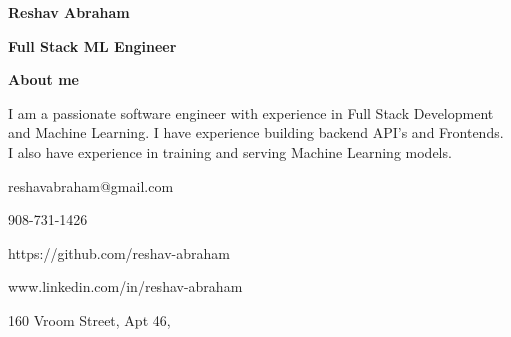 \documentclass{article}
\begin{document}
\begin{minipage}[t][0pt]{8in\linewidth}
    \begin{minipage}[t]{5.5in\linewidth}
    \Huge\vspace{0in}\hspace{-0.30em}\textbf{Reshav Abraham}  

    \vspace{0em}\hspace{-0.2em}\Large\textbf{Full Stack ML Engineer} 

    \vspace{0.5em}\hspace{0em}\small\textbf{About me} 

        \begin{minipage}[t]{0.6\textwidth\hspace{0em}}
        I am a passionate software engineer with experience in Full Stack Development
        and Machine Learning. I have experience building backend API's and Frontends. I also have experience in training and serving Machine Learning models. \par
        \end{minipage}
    \end{minipage}
    \begin{minipage}[t]{17em\linewidth\hspace{-4em}}
        
        \vspace{2.75em}
        \faEnvelopeO\hspace{0.4em}\small\mdseries\textrm{reshavabraham@gmail.com}

        \vspace{0.2em}
        \faPhone\hspace{0.65em}\small\mdseries\textrm{908-731-1426}
        
        \vspace{0.2em}
        \faGithub\hspace{0.6em}\small\mdseries\textrm{https://github.com/reshav-abraham}
        
        \vspace{0.2em}
        \faLinkedin\hspace{0.6em}\small\mdseries\textrm{www.linkedin.com/in/reshav-abraham}
        
        \vspace{0.2em}
        \faHome\hspace{0.4em}\small\mdseries\textrm{160 Vroom Street, Apt 46,} 
        

\end{minipage}
\end{minipage}
\end{document}

